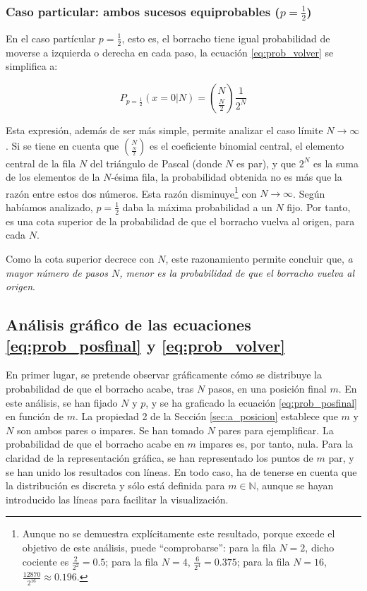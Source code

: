\subsubsection{Caso particular: ambos sucesos equiprobables ($p = \frac{1}{2}$)}
\label{sec:a_volver_1/2}
En el caso partícular $p = \frac{1}{2}$, esto es, el borracho tiene igual probabilidad de moverse a izquierda o derecha en cada paso, la ecuación \ref{eq:prob_volver} se simplifica a:

\begin{equation}
	P_{p = \frac{1}{2}}(x=0|N)=\binom{N}{\frac{N}{2}}\frac{1}{2^N}
	\label{eq:prob_volver_1/2}
\end{equation}

Esta expresión, además de ser más simple, permite analizar el caso límite $N\to \infty$. Si se tiene en cuenta que $\binom{N}{\frac{N}{2}}$ es el coeficiente binomial central, el elemento central de la fila $N$ del triángulo de Pascal (donde $N$ es par), y que $2^N$ es la suma de los elementos de la $N$-ésima fila, la probabilidad obtenida no es más que la razón entre estos dos números. Esta razón disminuye\footnote{Aunque no se demuestra explícitamente este resultado, porque excede el objetivo de este análisis, puede ``comprobarse'': para la fila $N=2$, dicho cociente es $\frac{2}{2^2} = 0.5$; para la fila $N=4$, $\frac{6}{2^4} = 0.375$; para la fila $N = 16$, $\frac{12870}{2^16} \approx 0.196$.} con $N\to \infty$. Según habíamos analizado, $p=\frac{1}{2}$ daba la máxima probabilidad a un $N$ fijo. Por tanto, es una cota superior de la probabilidad de que el borracho vuelva al origen, para cada $N$. 

Como la cota superior decrece con $N$, este razonamiento permite concluir que, \emph{a mayor número de pasos $N$, menor es la probabilidad de que el borracho vuelva al origen}.

\subsection{Análisis gráfico de las ecuaciones \ref{eq:prob_posfinal} y \ref{eq:prob_volver}}
\label{sec:a_grafico}

En primer lugar, se pretende observar gráficamente cómo se distribuye la probabilidad de que el borracho acabe, tras $N$ pasos, en una posición final $m$. En este análisis, se han fijado $N$ y $p$, y se ha graficado la ecuación \ref{eq:prob_posfinal} en función de $m$. La propiedad 2 de la Sección \ref{sec:a_posicion} establece que $m$ y $N$ son ambos pares o impares. Se han tomado $N$ pares para ejemplificar. La probabilidad de que el borracho acabe en $m$ impares es, por tanto, nula. Para la claridad de la representación gráfica, se han representado los puntos de $m$ par, y se han unido los resultados con líneas. En todo caso, ha de tenerse en cuenta que la distribución es discreta y sólo está definida para $m\in\mathbb N$, aunque se hayan introducido las líneas para facilitar la visualización.


